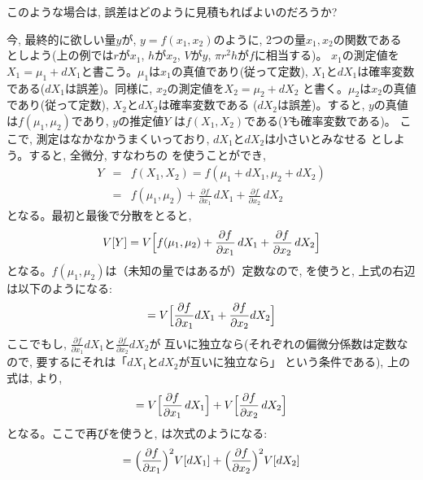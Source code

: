 このような場合は, 誤差はどのように見積もればよいのだろうか?

今, 最終的に欲しい量$y$が, $y=f(x_1, x_2)$のように, 2つの量$x_1, x_2$の関数である
としよう(上の例では$r$が$x_1$, $h$が$x_2$, $V$が$y$, $\pi r^2h$が$f$に相当する)。
$x_1$の測定値を$X_1=\mu_1+dX_1$と書こう。$\mu_1$は$x_1$の真値であり(従って定数), 
$X_1$と$dX_1$は確率変数である($dX_1$は誤差)。同様に, $x_2$の測定値を$X_2=\mu_2+dX_2$
と書く。$\mu_2$は$x_2$の真値であり(従って定数), $X_2$と$dX_2$は確率変数である
($dX_2$は誤差)。すると, $y$の真値は$f(\mu_1, \mu_2)$であり, $y$の推定値$Y$
は$f(X_1, X_2)$である($Y$も確率変数である)。
ここで, 測定はなかなかうまくいっており, $dX_1$と$dX_2$は小さいとみなせる
としよう。すると, 全微分, すなわちの
を使うことができ,  
\begin{eqnarray}
Y&=&f(X_1, X_2)=f(\mu_1+dX_1,\mu_2+dX_2)\nonumber\\
       &=&f(\mu_1, \mu_2)+ \frac{\partial f}{\partial x_1}\,dX_1+\frac{\partial f}{\partial x_2}\,dX_2\label{eq:gosa_zenbibun02}
\end{eqnarray}
となる。最初と最後で分散をとると, 
\begin{eqnarray}
V[Y] = V\Bigl[f(\mu_1, \mu_2)+ \frac{\partial f}{\partial x_1}\,dX_1+\frac{\partial f}{\partial x_2}\,dX_2\Bigr]\nonumber\\
\label{eq:gosa_zenbibun04}
\end{eqnarray}
となる。$f(\mu_1, \mu_2)$は（未知の量ではあるが）定数なので, を使うと, 上式の右辺は以下のようになる:
\begin{eqnarray}
 = V\Bigl[\frac{\partial f}{\partial x_1}dX_1+\frac{\partial f}{\partial x_2}dX_2\Bigr]\label{eq:gosa_zenbibun06}
\end{eqnarray}
ここでもし, $\frac{\partial f}{\partial x_1}dX_1$と$\frac{\partial f}{\partial x_2}dX_2$が
互いに独立なら(それぞれの偏微分係数は定数なので, 要するにそれは「$dX_1$と$dX_2$が互いに独立なら」
という条件である), 上の式は, より, 
\begin{eqnarray}
 = V\Bigl[\frac{\partial f}{\partial x_1}\,dX_1\Bigr]+V\Bigl[\frac{\partial f}{\partial x_2}\,dX_2\Bigr]
\label{eq:gosa_zenbibun07}
\end{eqnarray}
となる。ここで再びを使うと, は次式のようになる:
\begin{eqnarray}
 = \Bigl(\frac{\partial f}{\partial x_1}\Bigr)^2V[dX_1] + \Bigl(\frac{\partial f}{\partial x_2}\Bigr)^2V[dX_2]
\label{eq:gosa_zenbibun08}
\end{eqnarray}

